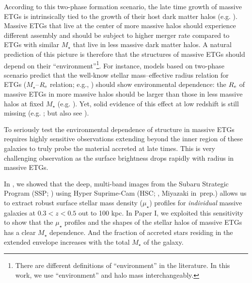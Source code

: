 \documentclass[a4paper,fleqn,usenatbib]{mnras}
\def\mstar{{$M_{\star}$}}
\def\mden{{$\mu_{\star}$}}
\begin{document}
    According to this two-phase formation scenario, the late time growth of massive 
    ETGs is intrinsically tied to the growth of their host dark matter halos 
    (e.g. \citealt{Leauthaud2012, Behroozi2013, Shankar2013}). 
    Massive ETGs that live at the center of more massive halos should experience 
    different assembly and should be subject to higher merger rate compared to 
    ETGs with similar \mstar{} that live in less massive dark matter halos. 
    A natural prediction of this picture is therefore that the structures of 
    massive ETGs should depend on their ``environment''\footnote{There are 
    different definitions of ``environment'' in the literature.  
    In this work, we use ``environment'' and halo mass interchangeably.}.
    For instance, models based on two-phase scenario predict that the well-know 
    stellar mass--effective radius relation for ETGs (\mstar{}--$R_{\rm e}$ relation; 
    e.g., \citealt{Shen2003, Guo2009}) should show environmental dependence: the 
    $R_{\rm e}$ of massive ETGs in more massive halos should be larger than those 
    in less massive halos at fixed \mstar{} 
    (e.g. \citealt{Shankar2013, Shankar2014}).
    Yet, solid evidence of this effect at low redshift is still missing 
    (e.g. \citealt{Nair2010, HCompany13}; but also see \citealt{Yoon2017}).
    
    
	
    To seriously test the environmental dependence of structure in massive ETGs 
    requires highly sensitive observations extending beyond the inner region of these 
    galaxies to truly probe the material accreted at late times. 
    This is very challenging observation as the surface brightness drops rapidly 
    with radius in massive ETGs. 
    
    In \citet[][Paper I hereafter]{hscMassiveI}, we showed that the deep, 
    multi-band images from the Subaru Strategic Program (SSP; \citealt{HSC-SSP,
    HSC-DR1}) using Hyper Suprime-Cam (HSC; \citealt{Miyazaki2012}, 
    Miyazaki in~prep.) allows us to extract robust surface stellar
    mass density (\mden{}) profiles for {\it individual} massive galaxies 
    at $0.3 < z < 0.5$ out to 100 kpc. 
    In Paper I, we exploited this sensitivity to show that the \mden{} profiles 
    and the shapes of the stellar halos of massive ETGs has a clear \mstar{} 
    dependence. 
    And the fraction of accreted stars residing in the extended envelope increases
    with the total \mstar{} of the galaxy.
    
\end{document}
